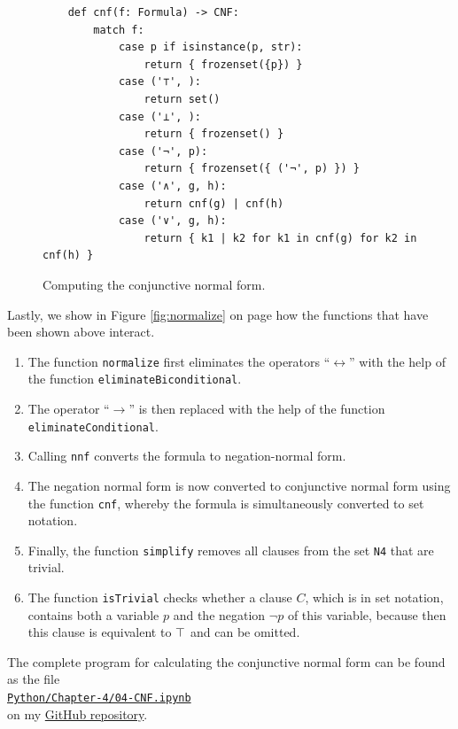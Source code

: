 \begin{figure}[!ht]
  \centering
\begin{verbatim}
    def cnf(f: Formula) -> CNF:
        match f:
            case p if isinstance(p, str):         
                return { frozenset({p}) }
            case ('⊤', ):
                return set()
            case ('⊥', ):
                return { frozenset() }
            case ('¬', p):
                return { frozenset({ ('¬', p) }) }
            case ('∧', g, h):
                return cnf(g) | cnf(h)
            case ('∨', g, h):
                return { k1 | k2 for k1 in cnf(g) for k2 in cnf(h) }
\end{verbatim}
\vspace*{-0.3cm}
  \caption{Computing the conjunctive normal form. }
  \label{fig:cnf}
\end{figure}
Lastly, we show in Figure \ref{fig:normalize} on page \pageref{fig:normalize}
how the functions that have been shown above interact.
\begin{enumerate}
\item The function \texttt{normalize} first eliminates the operators ``$\leftrightarrow$''
       with the help of the function \linebreak
      \texttt{eliminateBiconditional}.
\item The operator ``$\rightarrow$'' is then replaced with the help of the function
      \texttt{eliminateConditional}.
\item Calling \texttt{nnf} converts the formula to negation-normal form.
\item The negation normal form is now converted to conjunctive normal form using the function \texttt{cnf},
      whereby the formula is simultaneously converted to set notation.  
\item Finally, the function \texttt{simplify} removes all clauses from the set \texttt{N4} that are trivial.
\item The function \texttt{isTrivial} checks whether a clause $C$, which is in set notation,
      contains both a variable $p$ and the negation $\neg p$ of this variable, because then this
      clause is equivalent to $\top$ and can be omitted.
\end{enumerate}
The complete program for calculating the conjunctive normal form can be found as the file
\\[0.2cm]
\hspace*{1.3cm}
\href{https://github.com/karlstroetmann/Logic/blob/master/Python/Chapter-4/04-CNF.ipynb}{\texttt{Python/Chapter-4/04-CNF.ipynb}} 
\\[0.2cm]
on my \href{https://github.com/karlstroetmann/Logic}{GitHub repository}.


